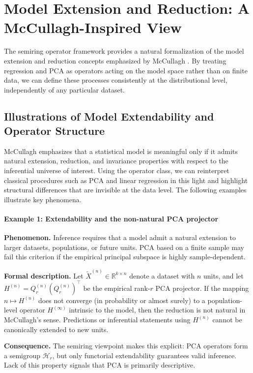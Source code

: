 \section{Model Extension and Reduction: A McCullagh-Inspired View}

The semiring operator framework provides a natural formalization of the model extension and reduction concepts emphasized by McCullagh \cite{mccullagh}. By treating regression and PCA as operators acting on the model space rather than on finite data, we can define these processes consistently at the distributional level, independently of any particular dataset.

\subsection{Illustrations of Model Extendability and Operator Structure}

McCullagh emphasizes that a statistical model is meaningful only if it admits natural extension, reduction, and invariance properties with respect to the inferential universe of interest. Using the operator class, we can reinterpret classical procedures such as PCA and linear regression in this light and highlight structural differences that are invisible at the data level. The following examples illustrate key phenomena.

\paragraph{Example 1: Extendability and the non-natural PCA projector}

\textbf{Phenomenon.}
Inference requires that a model admit a natural extension to larger datasets, populations, or future units. PCA based on a finite sample may fail this criterion if the empirical principal subspace is highly sample-dependent.


\textbf{Formal description.}
Let $\tilde X^{(n)} \in \mathbb{R}^{k \times n}$ denote a dataset with $n$ units, and let $H^{(n)} = Q_r^{(n)} (Q_r^{(n)})^\top$ be the empirical rank-$r$ PCA projector. If the mapping $n \mapsto H^{(n)}$
does not converge (in probability or almost surely) to a population-level operator $H^{(\infty)}$ intrinsic to the model, then the reduction is not natural in McCullagh’s sense. Predictions or inferential statements using $H^{(n)}$ cannot be canonically extended to new units.


\textbf{Consequence.}
The semiring viewpoint makes this explicit: PCA operators form a semigroup $\mathcal{H}_r$, but only functorial extendability guarantees valid inference. Lack of this property signals that PCA is primarily descriptive.


